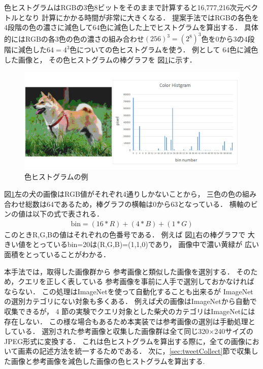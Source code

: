 \documentclass{deimj}
\begin{document}
色ヒストグラムはRGBの3色8ビットをそのままで計算すると16,777,216次元ベクトルとなり
計算にかかる時間が非常に大きくなる．
提案手法ではRGBの各色を4段階の色の濃さに減色して64色に減色した上でヒストグラムを算出する．
具体的にはRGBの各3色の色の濃さの組み合わせ$(256)^3=(2^8)^3$色を0から3の4段階に減色した$64=4^3$色についての色ヒストグラムを使う．
例として
64色に減色した画像と，
その色ヒストグラムの棒グラフを
図\ref{fig:color}に示す．
%
\begin{figure}[tb]
 \begin{center}
  \includegraphics[scale=0.28]{colorhist.jpg}
 \end{center}
 \caption{色ヒストグラムの例}
 \label{fig:color}
\end{figure}
%
%
図\ref{fig:color}左の犬の画像はRGB値がそれぞれ4通りしかないことから，
三色の色の組み合わせ総数は64であるため，棒グラフの横軸は0から63となっている．
横軸のビンの値は以下の式で表される．
\begin{eqnarray}
\mbox{bin} = (16 * R) + (4 * B) + (1 * G)
\end{eqnarray}
このときR,G,Bの値はそれぞれの色番号である．
例えば
図\ref{fig:color}右の棒グラフで
大きい値をとっているbin=20は(R,G,B)=(1,1,0)であり，
画像中で濃い黄緑が
広い面積をとっていることがわかる．

本手法では，取得した画像群から
参考画像と類似した画像を選別する．
そのため，クエリを正しく表している
参考画像を事前に人手で選別しておかなければならない．
この処理はImageNetを使って自動化することも出来るが
ImageNetの選別カテゴリにない対象も多くある．
例えば犬の画像はImageNetから自動で収集できるが，
4
節の実験でクエリ対象とした柴犬のカテゴリはImageNetには存在しない．
この様な場合もあるため本実装では参考画像の選別は手動処理としている．
%
選別された参考画像と収集した画像群は全て同じ320$\times$240サイズのJPEG形式に変換する．
これは色ヒストグラムを算出する際に，全ての画像において画素の記述方法を統一するためである．
次に，\ref{sec:tweetCollect}節で収集した画像と参考画像を減色した画像の色ヒストグラムを算出する.
\end{document}
